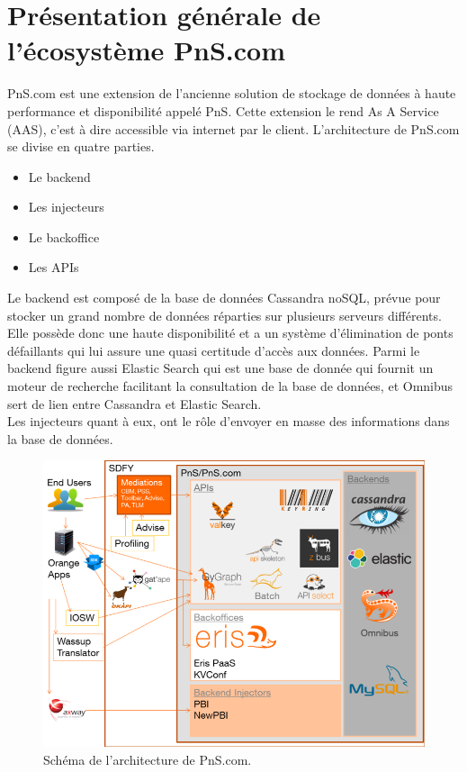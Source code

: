 
\section{Présentation générale de l'écosystème PnS.com}


PnS.com est une extension de l'ancienne solution de stockage de données à haute performance et disponibilité appelé PnS. Cette extension le rend As A Service (AAS), c'est à dire accessible via internet par le client. L'architecture de PnS.com se divise en quatre parties.

\begin{itemize}
    \item Le backend
    \item Les injecteurs
    \item Le backoffice
    \item Les APIs
\end{itemize}




Le backend est composé de la base de données Cassandra noSQL, prévue pour stocker un grand nombre de données réparties sur plusieurs serveurs différents. Elle possède donc une haute disponibilité et a un système d'élimination de ponts défaillants qui lui assure une quasi certitude d'accès aux données. Parmi le backend figure aussi Elastic Search qui est une base de donnée qui fournit un moteur de recherche facilitant la consultation de la base de données, et Omnibus sert de lien entre Cassandra et Elastic Search.\\

Les injecteurs quant à eux, ont le rôle d'envoyer en masse des informations dans la base de données.\\
\begin{figure}[htp]
  \centering
  \includegraphics[width=15cm]{images/pns/psn.png}
  \caption{Schéma de l'architecture de PnS.com.}
  \label{pns}
\end{figure}


